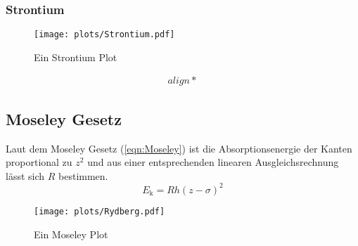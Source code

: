 \subsubsection{Strontium}
\begin{figure}
    \centering
    \texttt{[image: plots/Strontium.pdf]}
    \caption{Ein Strontium Plot}
    \label{fig:Strontium}
\end{figure}
\begin{align*}
    align*
\end{align*}

\subsection{Moseley Gesetz}
Laut dem Moseley Gesetz (\ref{eqn:Moseley}) ist die Absorptionsenergie der Kanten proportional zu $z^2$ und aus einer entsprechenden linearen Ausgleichsrechnung lässt sich $R$ bestimmen.
\begin{equation}
    E_{\text{k}}= Rh\left(z-\sigma\right)^2 \label{eqn:Moseley}
\end{equation}
\begin{figure}
    \centering
    \texttt{[image: plots/Rydberg.pdf]}
    \caption{Ein Moseley Plot}
    \label{fig:Moseley}
\end{figure}